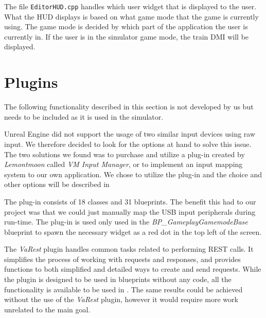 The file \verb|EditorHUD.cpp| handles which user widget that is displayed to the user. What the HUD displays is based on what game mode that the game is currently using. The game mode is decided by which part of the application the user is currently in. If the user is in the simulator game mode, the train DMI will be displayed.


\section{Plugins}

The following functionality described in this section is not developed by us but needs to be included as it is used in the simulator.

Unreal Engine did not support the usage of two similar input devices using raw input. We therefore decided to look for the options at hand to solve this issue. The two solutions we found was to purchase and utilize a plug-in created by \textit{Lemontmoon} called \textit{VM Input Manager}\footnotemark[1], or to implement an input mapping system to our own application. We chose to utilize the plug-in and the choice and other options will be described in 

The plug-in consists of 18 \cpp classes and 31 blueprints. The benefit this had to our project was that we could just manually map the USB input peripherals during run-time. The plug-in is used only used in the \textit{BP\_GameplayGamemodeBase} blueprint to spawn the necessary widget as a red dot in the top left of the screen. 

The \textit{VaRest} plugin handles common tasks related to performing REST calls. It simplifies the process of working with requests and responses, and provides functions to both simplified and detailed ways to create and send requests. While the plugin is designed to be used in blueprints without any \cpp code, all the functionality is available to be used in \cpp. The same results could be achieved without the use of the \textit{VaRest} plugin, however it would require more work unrelated to the main goal. 